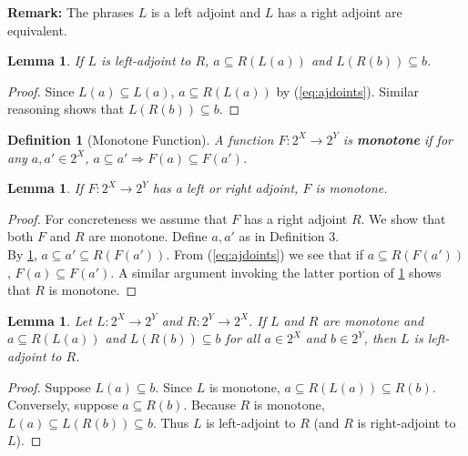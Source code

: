 \documentclass{article}
\newtheorem{lemma}[proposition]{Lemma}
\newtheorem{definition}[proposition]{Definition}
\begin{document}
\textbf{Remark:} The phrases $L$ is a left adjoint and $L$ has a right adjoint are equivalent. 

\begin{lemma}\label{lem:inv-img-adjoint-lem-1}
If $L$ is left-adjoint to $R$, $a \subseteq R(L(a))$ and $L(R(b)) \subseteq b$.
\end{lemma}

\begin{proof}
Since $L(a) \subseteq L(a)$, $a \subseteq R(L(a))$ by (\ref{eq:ajdoints}). Similar reasoning shows that $L(R(b)) \subseteq b$.
\end{proof}

\begin{definition}[Monotone Function]
A function $F : 2^X \to 2^Y$ is \textbf{monotone} if for any $a, a' \in 2^X$, $a \subseteq a' \Rightarrow F(a) \subseteq F(a')$.
\end{definition}

\begin{lemma}\label{lem:inv-image-adjoints-monotone}
If $F : 2^X \to 2^Y$ has a left or right adjoint, $F$ is monotone.
\end{lemma}

\begin{proof}
For concreteness we assume that $F$ has a right adjoint $R$. We show that both $F$ and $R$ are monotone. Define $a, a'$ as in Definition 3.\\

By \cref{lem:inv-img-adjoint-lem-1}, $a \subseteq a' \subseteq R(F(a'))$. From (\ref{eq:ajdoints}) we see that if $a \subseteq R(F(a'))$, $F(a) \subseteq F(a')$. A similar argument invoking the latter portion of \cref{lem:inv-img-adjoint-lem-1} shows that $R$ is monotone.
\end{proof}

\begin{lemma}
Let $L : 2^X \to 2^Y$ and $R : 2^Y \to 2^X$. If $L$ and $R$ are monotone and $a \subseteq R(L(a))$ and $L(R(b)) \subseteq b$ for all $a \in 2^X$ and $b \in 2^Y$, then $L$ is left-adjoint to $R$.
\end{lemma}

\begin{proof}
Suppose $L(a) \subseteq b$. Since $L$ is monotone, $a \subseteq R(L(a)) \subseteq R(b)$. Conversely, suppose $a \subseteq R(b)$. Because $R$ is monotone, $L(a) \subseteq L(R(b)) \subseteq b$. Thus $L$ is left-adjoint to $R$ (and $R$ is right-adjoint to $L$).
\end{proof}
\end{document}
